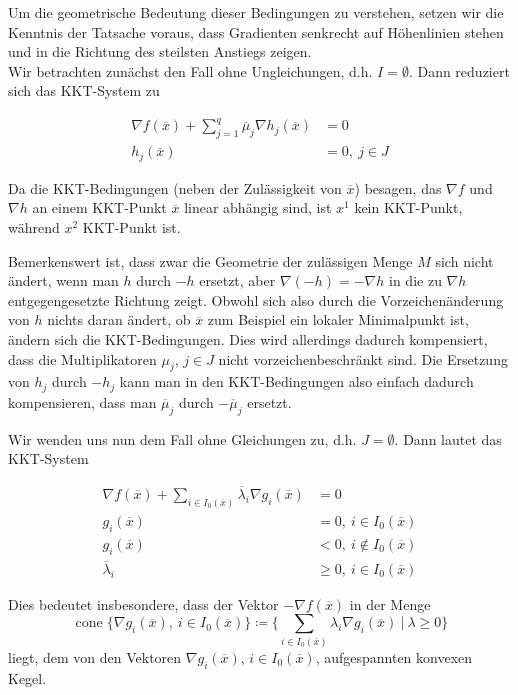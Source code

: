 \documentclass[12pt]{extreport} %
\theoremstyle{named}
\theoremstyle{nnamed}
\theoremstyle{itshape}
\theoremstyle{normal}
\begin{document}
Um die geometrische Bedeutung dieser Bedingungen zu verstehen, setzen wir die Kenntnis der Tatsache voraus, dass Gradienten senkrecht auf Höhenlinien stehen und in die Richtung des steilsten Anstiegs zeigen. ~\\

Wir betrachten zunächst den Fall ohne Ungleichungen, d.h. $I = \emptyset$. Dann reduziert sich das KKT-System zu	
	
\begin{align*}
	\nabla f(\overline{x}) + \sum_{j=1}^q \overline{\mu}_j \nabla h_j (\overline{x}) & = 0 \\
	h_j(\overline{x}) & = 0, ~ j \in J
\end{align*}	
	
Da die KKT-Bedingungen (neben der Zulässigkeit von $\overline{x}$) besagen, das $\nabla f$ und $\nabla h$ an einem KKT-Punkt $\overline{x}$ linear abhängig sind, ist $x^1$ kein KKT-Punkt, während $x^2$ KKT-Punkt ist. ~\bigskip

Bemerkenswert ist, dass zwar die Geometrie der zulässigen Menge $M$ sich nicht ändert, wenn man $h$ durch $-h$ ersetzt, aber $\nabla(-h) = -\nabla h$ in die zu $\nabla h$ entgegengesetzte Richtung zeigt. Obwohl sich also durch die Vorzeichenänderung von $h$ nichts daran ändert, ob $\overline{x}$ zum Beispiel ein lokaler Minimalpunkt ist, ändern sich die KKT-Bedingungen. Dies wird allerdings dadurch kompensiert, dass die Multiplikatoren $\mu_j$, $j \in J$ nicht vorzeichenbeschränkt sind. Die Ersetzung von $h_j$ durch $-h_j$ kann man in den KKT-Bedingungen also einfach dadurch kompensieren, dass man $\overline{\mu}_j$ durch $-\overline{\mu}_j$ ersetzt.~\bigskip

Wir wenden uns nun dem Fall ohne Gleichungen zu, d.h. $J = \emptyset$. Dann lautet das KKT-System

\begin{align*}
	\nabla f(\overline{x}) + \sum_{i \in I_0(\overline{x})} \overline{\lambda}_i \nabla g_i(\overline{x}) & = 0 \\
	g_i(\overline{x}) & = 0, ~i \in I_0(\overline{x}) \\
	g_i(\overline{x}) & < 0, ~i \notin I_0(\overline{x}) \\	 
	\overline{\lambda}_i & \geq 0, ~i \in I_0(\overline{x})
\end{align*}
	
Dies bedeutet insbesondere, dass der Vektor $-\nabla f(\overline{x})$ in der Menge
	$$ \operatorname{cone} \big\{ \nabla g_i(\overline{x}), ~i \in I_0(\overline{x}) \big\} \coloneqq \big\{ \sum_{i \in I_0(\overline{x})} \lambda_i \nabla g_i(\overline{x}) ~|~\lambda \geq 0 \big\} $$
liegt, dem von den Vektoren $\nabla g_i(\overline{x})$, $i \in I_0(\overline{x})$, aufgespannten konvexen Kegel. ~\bigskip
\end{document}
